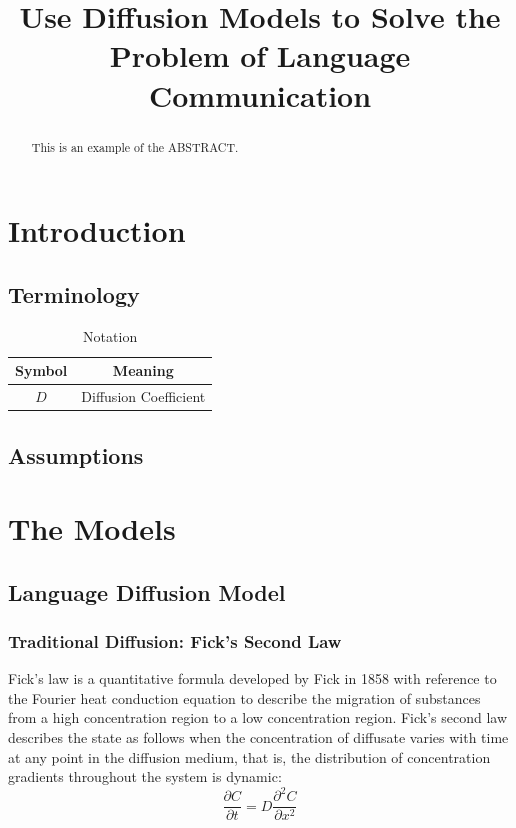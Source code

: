 \documentclass{mcmthesis}
\title{Use Diffusion Models to Solve the Problem of Language Communication}
\begin{document}
\setlength{2em}%

  \begin{abstract}
    This is an example of the ABSTRACT.
  \end{abstract}

  \maketitle
  \tableofcontents

  \clearpage%
  \section{Introduction}%

    \subsection{Terminology}%

    \begin{table}[h]
      \centering
      \caption{Notation}

      \begin{tabular}{cc}
        \toprule%
        Symbol&Meaning\\
        \midrule%
        {$D$}&Diffusion Coefficient\\
        \bottomrule%
      \end{tabular}
    \end{table}

    \subsection{Assumptions}%

  \section{The Models}


    \subsection{Language Diffusion Model}%
    \subsubsection{Traditional Diffusion: Fick's Second Law}%

    Fick's law is a quantitative formula developed by Fick in 1858
    with reference to the Fourier heat conduction equation
    to describe the migration of substances
    from a high concentration region to a low concentration region.
    Fick's second law describes the state as follows
    when the concentration of diffusate varies with time at any point in the diffusion medium,
    that is, the distribution of concentration gradients throughout the system is dynamic:
    $$\frac{\partial C}{\partial t}=D\frac{\partial^2C}{\partial x^2}$$
\end{document}
